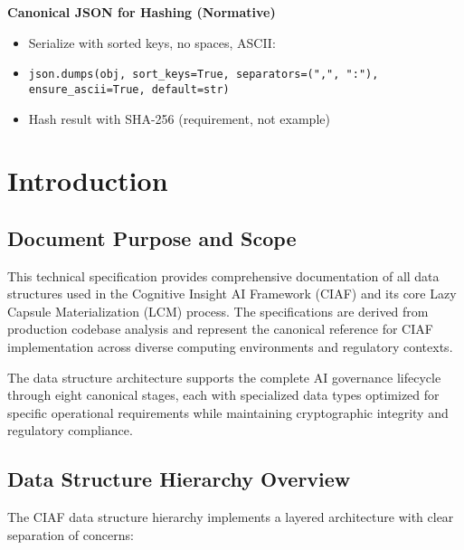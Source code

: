 \documentclass[12pt,a4paper]{article}
\begin{document}
\begin{infobox}
\textbf{Canonical JSON for Hashing (Normative)}
\begin{itemize}
\item Serialize with sorted keys, no spaces, ASCII:
\item \texttt{json.dumps(obj, sort\_keys=True, separators=(",", ":"), ensure\_ascii=True, default=str)}
\item Hash result with SHA-256 (requirement, not example)
\end{itemize}
\end{infobox}

\newpage
\tableofcontents
\newpage

\section{Introduction}

\subsection{Document Purpose and Scope}

This technical specification provides comprehensive documentation of all data structures used in the Cognitive Insight AI Framework (CIAF) and its core Lazy Capsule Materialization (LCM\texttrademark) process. The specifications are derived from production codebase analysis and represent the canonical reference for CIAF implementation across diverse computing environments and regulatory contexts.

The data structure architecture supports the complete AI governance lifecycle through eight canonical stages, each with specialized data types optimized for specific operational requirements while maintaining cryptographic integrity and regulatory compliance.

\subsection{Data Structure Hierarchy Overview}

The CIAF data structure hierarchy implements a layered architecture with clear separation of concerns:
\end{document}
